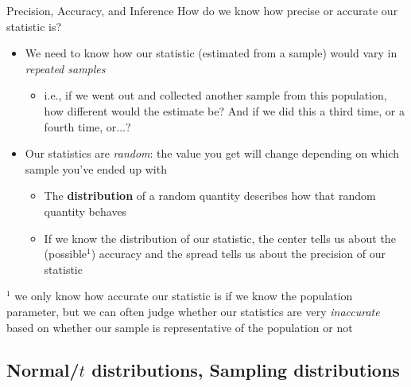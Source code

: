\documentclass[10pt,t]{beamer}
\begin{document}
\begin{frame}{Precision, Accuracy, and Inference}
How do we know how precise or accurate our statistic is?

\vspace{0.1cm}

\begin{itemize}
	\item We need to know how our statistic (estimated from a sample) would vary in \textit{repeated samples}
	\begin{itemize}
		\item i.e., if we went out and collected another sample from this population, how different would the estimate be? And if we did this a third time, or a fourth time, or...?
	\end{itemize}
	\item Our statistics are \textit{random}: the value you get will change depending on which sample you've ended up with
	\begin{itemize}
		\item The \textbf{distribution} of a random quantity describes how that random quantity behaves
		\item If we know the distribution of our statistic, the center tells us about the (possible${}^1$) accuracy and the spread tells us about the precision of our statistic
	\end{itemize}
\end{itemize}

\vspace{0.1cm}

\small ${}^1$ we only know how accurate our statistic is if we know the population parameter, but we can often judge whether our statistics are very \textit{inaccurate} based on whether our sample is representative of the population or not

\end{frame}

\subsection{Normal/$t$ distributions, Sampling distributions}
\end{document}
